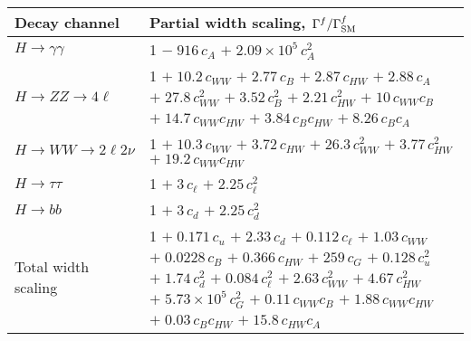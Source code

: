 \begin{tabular}{l|p{}}
    \hline
    Decay channel & Partial width scaling, $\Gamma^f/\Gamma^f_{\rm{SM}}$ \\ \hline
    $H \rightarrow \gamma\gamma$ & 1 $-\;916\,c_{A}$ $+\;2.09\times 10^{5}\,c_{A}^{2}$ \\
    $H \rightarrow ZZ \rightarrow 4\ell$ & 1 $+\;10.2\,c_{WW}$ $+\;2.77\,c_{B}$ $+\;2.87\,c_{HW}$ $+\;2.88\,c_{A}$ $+\;27.8\,c_{WW}^{2}$ $+\;3.52\,c_{B}^{2}$ $+\;2.21\,c_{HW}^{2}$ $+\;10\,c_{WW}c_{B}$ $+\;14.7\,c_{WW}c_{HW}$ $+\;3.84\,c_{B}c_{HW}$ $+\;8.26\,c_{B}c_{A}$ \\
    $H \rightarrow WW \rightarrow 2\ell2\nu$ & 1 $+\;10.3\,c_{WW}$ $+\;3.72\,c_{HW}$ $+\;26.3\,c_{WW}^{2}$ $+\;3.77\,c_{HW}^{2}$ $+\;19.2\,c_{WW}c_{HW}$ \\
    $H \rightarrow \tau\tau$ & 1 $+\;3\,c_{\ell}$ $+\;2.25\,c_{\ell}^{2}$ \\
    $H \rightarrow bb$ & 1 $+\;3\,c_{d}$ $+\;2.25\,c_{d}^{2}$ \\
    \hline
    Total width scaling & 1 $+\;0.171\,c_{u}$ $+\;2.33\,c_{d}$ $+\;0.112\,c_{\ell}$ $+\;1.03\,c_{WW}$ $+\;0.0228\,c_{B}$ $+\;0.366\,c_{HW}$ $+\;259\,c_{G}$ $+\;0.128\,c_{u}^{2}$ $+\;1.74\,c_{d}^{2}$ $+\;0.084\,c_{\ell}^{2}$ $+\;2.63\,c_{WW}^{2}$ $+\;4.67\,c_{HW}^{2}$ $+\;5.73\times 10^{5}\,c_{G}^{2}$ $+\;0.11\,c_{WW}c_{B}$ $+\;1.88\,c_{WW}c_{HW}$ $+\;0.03\,c_{B}c_{HW}$ $+\;15.8\,c_{HW}c_{A}$ \\
    \hline
\end{tabular}